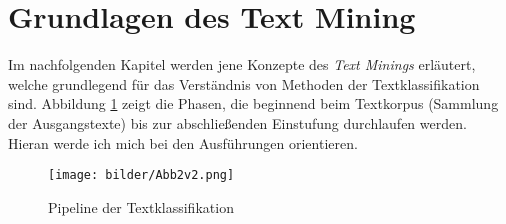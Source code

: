 \section{Grundlagen des Text Mining}\raggedbottom
Im nachfolgenden Kapitel werden jene Konzepte des \textit{Text Minings} erläutert, welche grundlegend für das Verständnis von Methoden der Textklassifikation sind. Abbildung \ref{pipetk} zeigt die Phasen, die beginnend beim Textkorpus (Sammlung der Ausgangstexte) bis zur abschließenden Einstufung durchlaufen werden. Hieran werde ich mich bei den Ausführungen orientieren.
\begin{figure}[htb]
	\begin{center}
		\texttt{[image: bilder/Abb2v2.png]}
		\caption{Pipeline der Textklassifikation \citep{Kow19}  }\label{pipetk}
	\end{center}
\end{figure}
